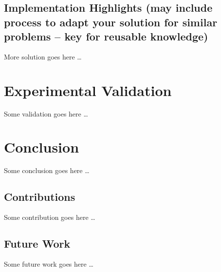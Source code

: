 \documentclass[]{article}
\renewcommand\refname{}         %
\begin{document}
\subsection{Implementation Highlights (may include process to adapt your
solution for similar problems -- key for reusable
knowledge)}\label{implementation-highlights-may-include-process-to-adapt-your-solution-for-similar-problems-key-for-reusable-knowledge}

More solution goes here \ldots{}

\section{Experimental Validation}\label{experimental-validation}

Some validation goes here \ldots{}

\section{Conclusion}\label{conclusion}

Some conclusion goes here \ldots{}

\subsection{Contributions}\label{contributions}

Some contribution goes here \ldots{}

\subsection{Future Work}\label{future-work}

Some future work goes here \ldots{}

\renewcommand\refname{References}

\end{document}

